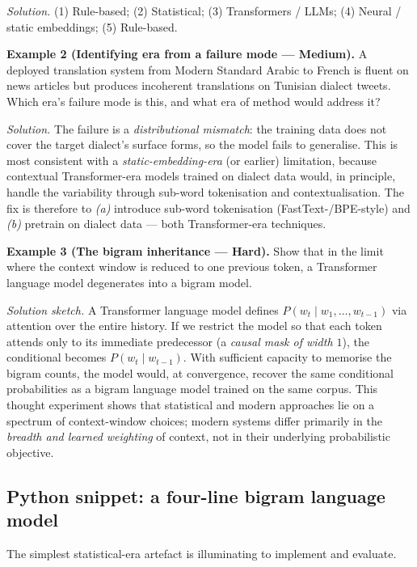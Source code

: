 \textit{Solution.} (1) Rule-based; (2) Statistical; (3) Transformers / LLMs; (4) Neural / static embeddings; (5) Rule-based.

\medskip

\textbf{Example 2 (Identifying era from a failure mode --- Medium).}
A deployed translation system from Modern Standard Arabic to French is fluent on news articles but produces incoherent translations on Tunisian dialect tweets. Which era's failure mode is this, and what era of method would address it?

\textit{Solution.} The failure is a \emph{distributional mismatch}: the training data does not cover the target dialect's surface forms, so the model fails to generalise. This is most consistent with a \emph{static-embedding-era} (or earlier) limitation, because contextual Transformer-era models trained on dialect data would, in principle, handle the variability through sub-word tokenisation and contextualisation. The fix is therefore to \emph{(a)} introduce sub-word tokenisation (FastText-/BPE-style) and \emph{(b)} pretrain on dialect data --- both Transformer-era techniques.

\medskip

\textbf{Example 3 (The bigram inheritance --- Hard).}
Show that in the limit where the context window is reduced to one previous token, a Transformer language model degenerates into a bigram model.

\textit{Solution sketch.} A Transformer language model defines $P(w_t \mid w_1, \dots, w_{t-1})$ via attention over the entire history. If we restrict the model so that each token attends only to its immediate predecessor (a \emph{causal mask of width $1$}), the conditional becomes $P(w_t \mid w_{t-1})$. With sufficient capacity to memorise the bigram counts, the model would, at convergence, recover the same conditional probabilities as a bigram language model trained on the same corpus. This thought experiment shows that statistical and modern approaches lie on a spectrum of context-window choices; modern systems differ primarily in the \emph{breadth and learned weighting} of context, not in their underlying probabilistic objective.

\subsection{Python snippet: a four-line bigram language model}

The simplest statistical-era artefact is illuminating to implement and evaluate.

